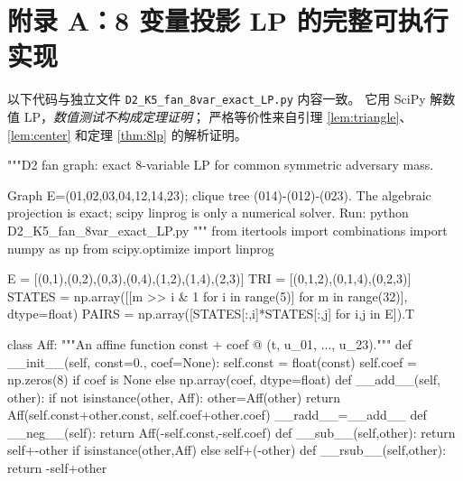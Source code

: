 \documentclass[11pt,a4paper]{ctexart}
\theoremstyle{remark}\newtheorem{remark}[theorem]{说明}
\begin{document}
\section*{附录 A：8 变量投影 LP 的完整可执行实现}
以下代码与独立文件 \texttt{D2\_K5\_fan\_8var\_exact\_LP.py} 内容一致。
它用 SciPy 解数值 LP，\emph{数值测试不构成定理证明}；
严格等价性来自引理 \ref{lem:triangle}、\ref{lem:center}
和定理 \ref{thm:8lp} 的解析证明。
\begin{CodeListing}
"""D2 fan graph: exact 8-variable LP for common symmetric adversary mass.

Graph E=(01,02,03,04,12,14,23); clique tree (014)-(012)-(023).
The algebraic projection is exact; scipy linprog is only a numerical solver.
Run: python D2_K5_fan_8var_exact_LP.py
"""
from itertools import combinations
import numpy as np
from scipy.optimize import linprog

E = [(0,1),(0,2),(0,3),(0,4),(1,2),(1,4),(2,3)]
TRI = [(0,1,2),(0,1,4),(0,2,3)]
STATES = np.array([[m >> i & 1 for i in range(5)] for m in range(32)], dtype=float)
PAIRS = np.array([STATES[:,i]*STATES[:,j] for i,j in E]).T

class Aff:
    """An affine function const + coef @ (t, u_01, ..., u_23)."""
    def __init__(self, const=0., coef=None):
        self.const = float(const)
        self.coef = np.zeros(8) if coef is None else np.array(coef, dtype=float)
    def __add__(self, other):
        if not isinstance(other, Aff): other=Aff(other)
        return Aff(self.const+other.const, self.coef+other.coef)
    __radd__=__add__
    def __neg__(self): return Aff(-self.const,-self.coef)
    def __sub__(self,other): return self+-other if isinstance(other,Aff) else self+(-other)
    def __rsub__(self,other): return -self+other



\end{CodeListing}
\end{document}
